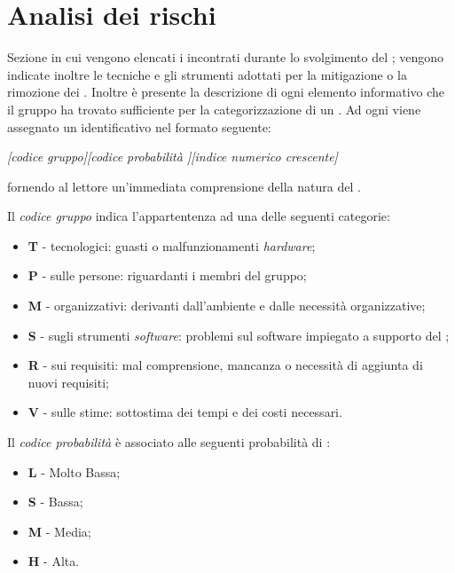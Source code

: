 \section{Analisi dei rischi} 
Sezione in cui vengono elencati i  incontrati durante lo svolgimento del ; vengono indicate inoltre le tecniche e gli strumenti adottati per la mitigazione o la rimozione dei . Inoltre \`e presente la descrizione di ogni elemento informativo che il gruppo ha trovato sufficiente per la categorizzazione di un .
Ad ogni  viene assegnato un identificativo nel formato seguente: 

\begin{center}
\textit{[codice gruppo][codice probabilit\`a ][indice numerico crescente]}  
\end{center}

fornendo al lettore un'immediata comprensione della natura del .

Il \textit{codice gruppo} indica l'appartentenza ad una delle seguenti categorie:
\begin{itemize}
\item \textbf{T} -  tecnologici: guasti o malfunzionamenti \textit{hardware};
\item \textbf{P} -  sulle persone: riguardanti i membri del gruppo;
\item \textbf{M} -  organizzativi: derivanti dall'ambiente e dalle necessit\`a organizzative;
\item \textbf{S} -  sugli strumenti \textit{software}: problemi sul software impiegato a supporto del ;
\item \textbf{R} -  sui requisiti: mal comprensione, mancanza o necessit\`a di aggiunta di nuovi requisiti;
\item \textbf{V} -  sulle stime: sottostima dei tempi e dei costi necessari.
\end{itemize}

Il \textit{codice probabilit\`a } \`e associato alle seguenti probabilit\`a di : 
\begin{itemize}
\item \textbf{L} - Molto Bassa;
\item \textbf{S} - Bassa;
\item \textbf{M} - Media;
\item \textbf{H} - Alta.
\end{itemize}

